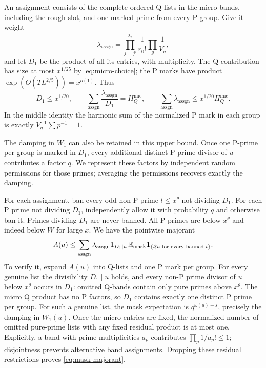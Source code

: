 An assignment consists of the complete ordered Q-lists in the
micro bands, including the rough slot, and one marked prime
from every P-group. Give it weight
\[
 \lambda_{\mathrm{assgn}}
  =\prod_{j=j'}^{j_x}\frac1{r_0!}\prod_g\frac1{V_g},
\]
and let $D_1$ be the product of all its entries, with
multiplicity. The Q contribution has size at most $x^{1/25}$ by
\eqref{eq:micro-choice}; the P marks have product
$\exp(O(TL^{2/5}))=x^{o(1)}$. Thus
\begin{equation}\label{eq:assignment-size}
 D_1\le x^{1/20},\qquad
 \sum_{\mathrm{assgn}}\frac{\lambda_{\mathrm{assgn}}}{D_1}
            =H_Q^{\mathrm{mic}},\qquad
 \sum_{\mathrm{assgn}}\lambda_{\mathrm{assgn}}
            \le x^{1/20}H_Q^{\mathrm{mic}}.
\end{equation}
In the middle identity the harmonic sum of the normalized
P mark in each group is exactly $V_g^{-1}\sum p^{-1}=1$.

The damping in $W_1$ can also be retained in this upper bound.
Once one P-prime per group is marked in $D_1$, every additional
distinct P-prime divisor of $u$ contributes a factor $q$. We represent
these factors by independent random permissions for those primes;
averaging the permissions recovers exactly the damping.

For each assignment, ban every odd non-P prime $l\le x^\theta$
not dividing $D_1$. For each P prime not dividing $D_1$,
independently allow it with probability $q$ and otherwise ban it.
Primes dividing $D_1$ are never banned.
All P primes are below $x^\theta$ and indeed below $W$ for large
$x$. We have the pointwise majorant
\begin{equation}\label{eq:mask-majorant}
 A(u)\le
 \sum_{\mathrm{assgn}}\lambda_{\mathrm{assgn}}
     \mathbf 1_{D_1\mid u}\,
     \mathbb E_{\mathrm{mask}}\mathbf 1_{\{l\nmid u\text{ for every banned }l\}}.
\end{equation}
To verify it, expand $A(u)$ into Q-lists and one P mark per group.
For every genuine list the divisibility $D_1\mid u$ holds, and
every non-P prime divisor of $u$ below $x^\theta$ occurs in
$D_1$: omitted Q-bands contain only pure primes above $x^\theta$.
The micro Q product has no P factors, so $D_1$ contains exactly
one distinct P prime per group. For such a genuine list, the
mask expectation is $q^{\omega(u)-s}$, precisely the damping in
$W_1(u)$. Once the micro entries are fixed, the normalized
number of omitted pure-prime lists with any fixed residual
product is at most one. Explicitly, a band with prime
multiplicities $a_p$ contributes $\prod_p1/a_p!\le1$; disjointness
prevents alternative band assignments. Dropping these residual
restrictions proves \eqref{eq:mask-majorant}.

